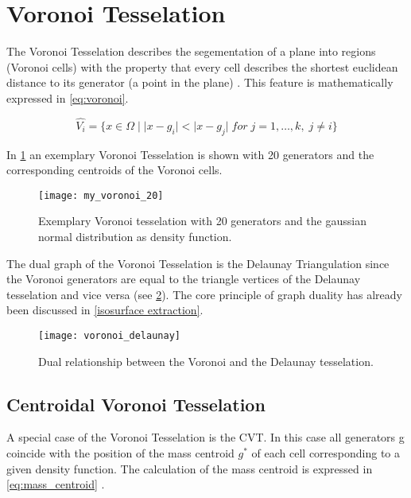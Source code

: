 \section{Voronoi Tesselation}
\label{cvt}

The Voronoi Tesselation describes  the segementation of a plane into regions (Voronoi cells) with the property that every cell describes the shortest euclidean distance to its generator (a point in the plane) \cite{Du99}. This feature is mathematically expressed in \cref{eq:voronoi}.

\begin{equation}
\label{eq:voronoi}
\widehat{V_i} = \big\{ x \in  \Omega \; | \; | x-g_i |  < |x-g_j| \; for \; j = 1,\dots,k, \; j \neq i \big\} 
\end{equation}

In \cref{fig:vor} an exemplary Voronoi Tesselation is shown with 20 generators and the corresponding centroids of the Voronoi cells.

\begin{figure}[H]
	\centering
	\texttt{[image: my\_voronoi\_20]}
	\caption{Exemplary Voronoi tesselation with 20 generators and the gaussian normal distribution as density function. \label{fig:vor}}
\end{figure}

The dual graph of the Voronoi Tesselation is the Delaunay Triangulation since the Voronoi generators are equal to the triangle vertices of the Delaunay tesselation and vice versa (see \cref{fig:vor_del}).
The core principle of graph duality has already been discussed in \cref{isosurface extraction}.

\begin{figure}[H]
	\centering
	\texttt{[image: voronoi\_delaunay]}
	\caption{Dual relationship between the Voronoi and the Delaunay tesselation. \label{fig:vor_del}}
\end{figure}

\subsection{Centroidal Voronoi Tesselation}

A special case of the Voronoi Tesselation is the \ac{CVT}. In this case all generators g coincide with the position of the mass centroid $ g^*$ of each cell corresponding to a given density function. The calculation of the mass centroid is expressed in \cref{eq:mass_centroid} \cite{Du99}.

